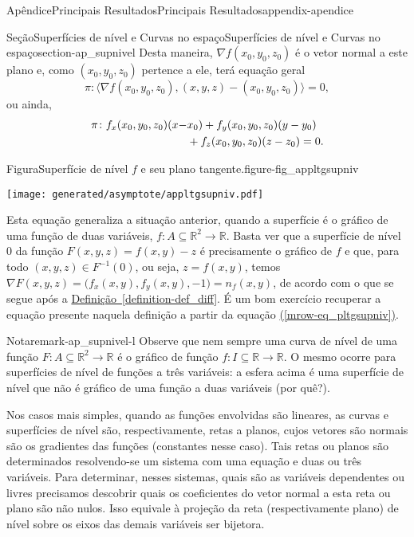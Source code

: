 \documentclass[oneside,10pt,]{book}
\newcommand{\xreffont}{\relax}
\numberwithin{equation}{section}
\newcommand{\R}{\mathbb R}
\begin{document}
\begin{appendixptx}{Apêndice}{Principais Resultados}{}{Principais Resultados}{}{}{appendix-apendice}
\begin{sectionptx}{Seção}{Superfícies de nível e Curvas no espaço}{}{Superfícies de nível e Curvas no espaço}{}{}{section-ap_supnivel}
Desta maneira, \(\nabla f(x_0,y_0,z_0)\) é o vetor normal a este plano e, como \((x_0,y_0,z_0)\) pertence a ele, terá equação geral%
\begin{equation*}
\pi\colon \big\langle \nabla
f(x_0,y_0,z_0),(x,y,z)-(x_0,y_0,z_0)\big\rangle=0,
\end{equation*}
ou ainda,%
\begin{align}
\pi\colon f_x(x_0,y_0,z_0)(x-&
x_0)+f_y(x_0,y_0,z_0)(y-y_0)\notag\\
& +f_z(x_0,y_0,z_0)(z-z_0)=0.\label{mrow-eq_pltgsupniv}
\end{align}
\begin{figureptx}{Figura}{Superfície de nível \(f\) e seu plano tangente.}{figure-fig_appltgsupniv}{}%
\begin{image}{0.25}{0.5}{0.25}{}%
\texttt{[image: generated/asymptote/appltgsupniv.pdf]}
\end{image}%
\tcblower
\end{figureptx}%
%
\par
Esta equação generaliza a situação anterior, quando a superfície é o gráfico de uma função de duas variáveis, \(f\colon
A\subseteq\mathbb R^2\to\R\). Basta ver que a superfície de nível \(0\) da função \(F(x,y,z)=f(x,y)-z\) é precisamente o gráfico de \(f\) e que, para todo \((x,y,z)\in F^{-1}(0)\), ou seja, \(z=f(x,y)\), temos \(\nabla
F(x,y,z)=\Big(f_x(x,y),f_y(x,y),-1\big)=n_f(x,y)\), de acordo com o que se segue após a \hyperref[definition-def_diff]{Definição~{\xreffont\ref{definition-def_diff}}}. É um bom exercício recuperar a equação presente naquela definição a partir da equação \hyperref[mrow-eq_pltgsupniv]{({\xreffont\ref{mrow-eq_pltgsupniv}})}.%
\begin{remark}{Nota}{}{remark-ap_supnivel-l}%
Observe que nem sempre uma curva de nível de uma função \(F\colon
A\subseteq\R^2\to\R\) é o gráfico de função \(f\colon
I\subseteq\R\to\R\). O mesmo ocorre para superfícies de nível de funções a três variáveis: a esfera acima é uma superfície de nível que não é gráfico de uma função a duas variáveis (por quê?).%
\end{remark}
Nos casos mais simples, quando as funções envolvidas são lineares, as curvas e superfícies de nível são, respectivamente, retas a planos, cujos vetores são normais são os gradientes das funções (constantes nesse caso). Tais retas ou planos são determinados resolvendo-se um sistema com uma equação e duas ou três variáveis. Para determinar, nesses sistemas, quais são as variáveis dependentes ou livres precisamos descobrir quais os coeficientes do vetor normal a esta reta ou plano são não nulos. Isso equivale à projeção da reta (respectivamente plano) de nível sobre os eixos das demais variáveis ser bijetora.%

\end{sectionptx}
\end{appendixptx}
\end{document}
